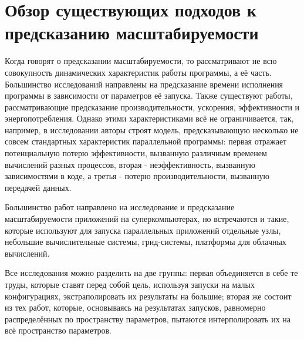 \section{Обзор существующих подходов к предсказанию масштабируемости}
	Когда говорят о предсказании масштабируемости, то рассматривают не всю совокупность динамических характеристик работы программы, а её часть. Большинство исследований направлены на предсказание времени исполнения программы в зависимости от параметров её запуска. Также существуют работы, рассматривающие предсказание производительности, ускорения, эффективности и энергопотребления. Однако этими характеристиками всё не ограничивается, так, например, в исследовании \cite{efficiency_prediction} авторы строят модель, предсказывающую несколько не совсем стандартных характеристик параллельной программы: первая отражает потенциальную потерю эффективности, вызванную различным временем вычислений разных процессов, вторая - неэффективность, вызванную зависимостями в коде, а третья - потерю производительности, вызванную передачей данных.

	Большинство работ направлено на исследование и предсказание масштабируемости приложений на суперкомпьютерах, но встречаются и такие, которые используют для запуска параллельных приложений отдельные узлы, небольшие вычислительные системы, грид-системы, платформы для облачных вычислений.

	Все исследования можно разделить на две группы: первая объединяется в себе те труды, которые ставят перед собой цель, используя запуски на малых конфигурациях, экстраполировать их результаты на большие; вторая же состоит из тех работ, которые, основываясь на результатах запусков, равномерно распределённых по пространству параметров, пытаются интерполировать их на всё пространство параметров.

